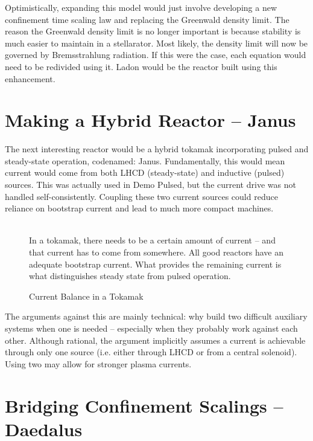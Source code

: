 Optimistically, expanding this model would just involve developing a new confinement time scaling law and replacing the Greenwald density limit. The reason the Greenwald density limit is no longer important is because stability is much easier to maintain in a stellarator. Most likely, the density limit will now be governed by Bremsstrahlung radiation. If this were the case, each equation would need to be redivided using it. Ladon would be the reactor built using this enhancement.

\section{Making a Hybrid Reactor -- Janus}

The next interesting reactor would be a hybrid tokamak incorporating pulsed and steady-state operation, codenamed: Janus. Fundamentally, this would mean current would come from both LHCD (steady-state) and inductive (pulsed) sources. This was actually used in Demo Pulsed, but the current drive was not handled self-consistently. Coupling these two current sources could reduce reliance on bootstrap current and lead to much more compact machines.

\begin{figure}
	\centering
	\begin{adjustbox}{width=0.75\textwidth}
		
	\end{adjustbox}
	\caption{Current Balance in a Tokamak} ~\\
	\small In a tokamak, there needs to be a certain amount of current -- and that current has to come from somewhere. All good reactors have an adequate bootstrap current. What provides the remaining current is what distinguishes steady state from pulsed operation.
\end{figure}

The arguments against this are mainly technical: why build two difficult auxiliary systems when one is needed -- especially when they probably work against each other. Although rational, the argument implicitly assumes a current is achievable through only one source (i.e. either through LHCD or from a central solenoid). Using two may allow for stronger plasma currents.

\section{Bridging Confinement Scalings -- Daedalus}

